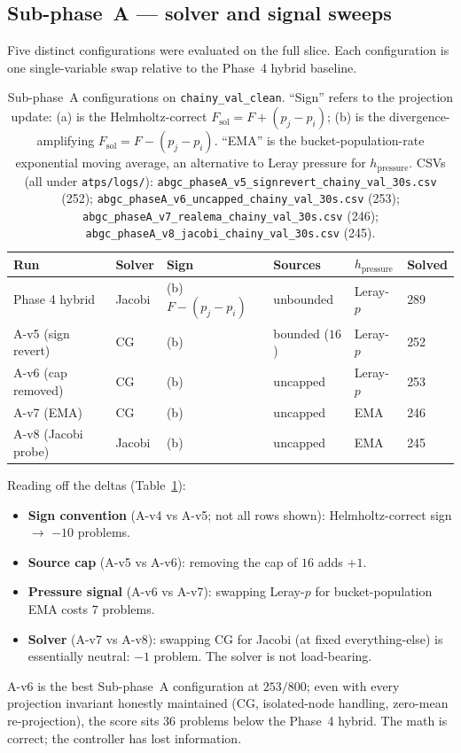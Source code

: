 \documentclass[11pt]{article}
\newcommand{\lpath}[1]{\texttt{\nolinkurl{#1}}}
\begin{document}
\subsection{Sub-phase~A --- solver and signal sweeps}\label{sec:phaseA}

Five distinct configurations were evaluated on the full slice. Each
configuration is one single-variable swap relative to the Phase~4 hybrid
baseline.

\begin{table}[t]
\centering
\small
\begin{tabular}{llllll}
\toprule
Run & Solver & Sign & Sources & $h_\mathrm{pressure}$ & Solved \\
\midrule
Phase 4 hybrid & Jacobi & (b) $F-(p_j{-}p_i)$ & unbounded & Leray-$p$ & 289 \\
A-v5 (sign revert) & CG & (b) & bounded ($16$) & Leray-$p$ & 252 \\
A-v6 (cap removed) & CG & (b) & uncapped & Leray-$p$ & 253 \\
A-v7 (EMA) & CG & (b) & uncapped & EMA & 246 \\
A-v8 (Jacobi probe) & Jacobi & (b) & uncapped & EMA & 245 \\
\bottomrule
\end{tabular}
\caption{Sub-phase~A configurations on \lpath{chainy_val_clean}.
``Sign'' refers to the projection update:
(a) is the Helmholtz-correct $F_\mathrm{sol} = F + (p_j - p_i)$;
(b) is the divergence-amplifying $F_\mathrm{sol} = F - (p_j - p_i)$.
``EMA'' is the bucket-population-rate exponential moving average, an
alternative to Leray pressure for $h_\mathrm{pressure}$.
CSVs (all under \lpath{atps/logs/}):
\lpath{abgc_phaseA_v5_signrevert_chainy_val_30s.csv} (252);
\lpath{abgc_phaseA_v6_uncapped_chainy_val_30s.csv} (253);
\lpath{abgc_phaseA_v7_realema_chainy_val_30s.csv} (246);
\lpath{abgc_phaseA_v8_jacobi_chainy_val_30s.csv} (245).}
\label{tab:phaseA}
\end{table}

Reading off the deltas (Table~\ref{tab:phaseA}):
\begin{itemize}
\item \textbf{Sign convention} (A-v4 vs A-v5; not all rows shown):
      Helmholtz-correct sign $\to$ $-10$ problems.
\item \textbf{Source cap} (A-v5 vs A-v6): removing the cap of $16$ adds $+1$.
\item \textbf{Pressure signal} (A-v6 vs A-v7): swapping Leray-$p$ for
      bucket-population EMA costs $7$ problems.
\item \textbf{Solver} (A-v7 vs A-v8): swapping CG for Jacobi (at fixed
      everything-else) is essentially neutral: $-1$ problem. The solver
      is not load-bearing.
\end{itemize}
A-v6 is the best Sub-phase~A configuration at $253/800$; even with every
projection invariant honestly maintained (CG, isolated-node handling,
zero-mean re-projection), the score sits $36$ problems below the
Phase~4 hybrid. The math is correct; the controller has lost information.
\end{document}
